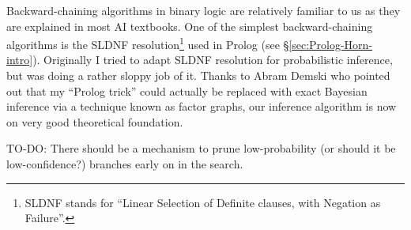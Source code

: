 %
%
%
%

Backward-chaining algorithms in binary logic are relatively familiar to us as they are explained in most AI textbooks.  One of the simplest backward-chaining algorithms is the SLDNF resolution\footnote{SLDNF stands for ``Linear Selection of Definite clauses, with Negation as Failure''.} used in Prolog (see \S\ref{sec:Prolog-Horn-intro}).  Originally I tried to adapt SLDNF resolution for probabilistic inference, but was doing a rather sloppy job of it.  Thanks to Abram Demski who pointed out that my ``Prolog trick'' could actually be replaced with exact Bayesian inference via a technique known as factor graphs, our inference algorithm is now on very good theoretical foundation.

TO-DO: There should be a mechanism to prune low-probability (or should it be low-confidence?) branches early on in the search.



